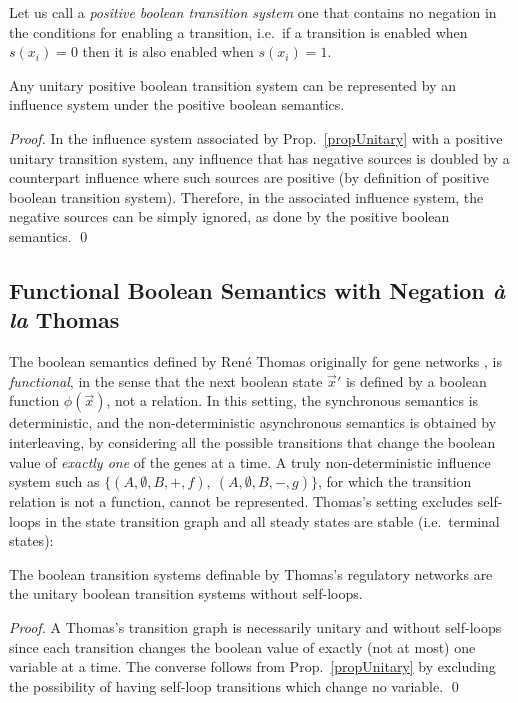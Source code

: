 \documentclass{llncs}
\begin{document}
Let us call a \emph{positive boolean transition system} one that contains no negation in the conditions for enabling a transition,
i.e.~if a transition is enabled when $s(x_i)=0$ then it is also enabled when $s(x_i)=1$.

\begin{corollary}
  Any unitary positive boolean transition system can be represented
  by an influence system under the positive boolean semantics.
\end{corollary}
\begin{proof}
  In the influence system associated by Prop.~\ref{propUnitary} with a positive unitary transition system,
  any influence that has negative sources is doubled by a counterpart influence where such sources are positive (by definition of positive boolean transition system).
  Therefore, in the associated influence system, the negative sources can be simply ignored, as done by the positive boolean semantics.
  \qed
  \end{proof}


\subsection{Functional Boolean Semantics with Negation \emph{\`a la} Thomas}
  

The boolean semantics defined by Ren\'e Thomas originally for gene networks \cite{TA90book}, is \emph{functional}, in the sense that
the next boolean state ${\vec x}'$ is defined by a boolean function $\phi(\vec x)$, not a relation.
In this setting, the synchronous semantics is deterministic, and the non-deterministic asynchronous semantics
is obtained by interleaving, by considering all the possible transitions that change the boolean value of \emph{exactly one} of the genes at a time.
A truly non-deterministic influence system such as $\{(A,\emptyset,B,+,f),\ (A,\emptyset, B,-,g)\}$, for which the transition relation is not a function,
cannot be represented. 
Thomas's setting excludes self-loops in the state transition graph and all steady states are stable (i.e.~terminal states):


\begin{proposition}
  The boolean transition systems definable by Thomas's regulatory networks are the unitary boolean transition systems without self-loops.
\end{proposition}
\begin{proof}
  A Thomas's transition graph is necessarily unitary and without self-loops since each transition changes the boolean value of exactly (not at most) one variable at a time.
The converse follows from Prop.~\ref{propUnitary} by excluding the possibility of having self-loop transitions which change no variable.
  \qed
\end{proof}
\end{document}
